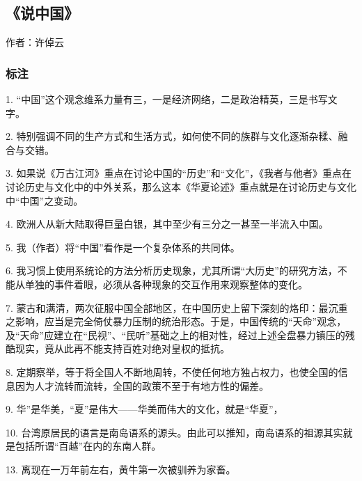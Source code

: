\subsection{《说中国》}

作者：许倬云

\subsubsection{标注}

1. “中国”这个观念维系力量有三，一是经济网络，二是政治精英，三是书写文字。

2. 特别强调不同的生产方式和生活方式，如何使不同的族群与文化逐渐杂糅、融合与交错。

3. 如果说《万古江河》重点在讨论中国的“历史”和“文化”，《我者与他者》重点在讨论历史与文化中的中外关系，那么这本《华夏论述》重点就是在讨论历史与文化中“中国”之变动。

4. 欧洲人从新大陆取得巨量白银，其中至少有三分之一甚至一半流入中国。

5. 我（作者）将“中国”看作是一个复杂体系的共同体。

6. 我习惯上使用系统论的方法分析历史现象，尤其所谓“大历史”的研究方法，不能从单独的事件着眼，必须从各种现象的交互作用来观察整体的变化。

7. 蒙古和满清，两次征服中国全部地区，在中国历史上留下深刻的烙印：最沉重之影响，应当是完全倚仗暴力压制的统治形态。于是，中国传统的“天命”观念，及“天命”应建立在“民视”、“民听”基础之上的相对性，经过上述全盘暴力镇压的残酷现实，竟从此再不能支持百姓对绝对皇权的抵抗。

8. 定期察举，等于将全国人不断地周转，不使任何地方独占权力，也使全国的信息因为人才流转而流转，全国的政策不至于有地方性的偏差。

9. 华”是华美，“夏”是伟大——华美而伟大的文化，就是“华夏”，

10. 台湾原居民的语言是南岛语系的源头。由此可以推知，南岛语系的祖源其实就是包括所谓“百越”在内的东南人群。

13. 离现在一万年前左右，黄牛第一次被驯养为家畜。

